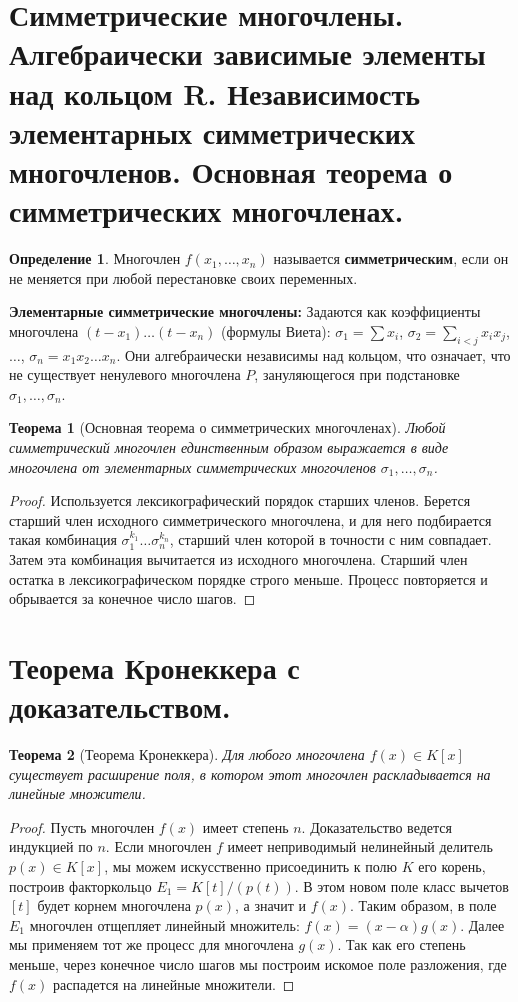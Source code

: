 \documentclass[12pt, a4paper]{article}
\theoremstyle{definition}
\newtheorem{definition}{Определение}[section]
\theoremstyle{plain}
\newtheorem{theorem}{Теорема}[section]
\begin{document}
	\newpage
	\section{Симметрические многочлены. Алгебраически зависимые элементы над кольцом R. Независимость элементарных симметрических многочленов. Основная теорема о симметрических многочленах.}
	
	\begin{definition}
		Многочлен $f(x_1, \dots, x_n)$ называется \textbf{симметрическим}, если он не меняется при любой перестановке своих переменных.
	\end{definition}
	
	\textbf{Элементарные симметрические многочлены:}
	Задаются как коэффициенты многочлена $(t-x_1)\dots(t-x_n)$ (формулы Виета):
	$\sigma_1 = \sum x_i$, $\sigma_2 = \sum_{i<j} x_i x_j$, $\dots$, $\sigma_n = x_1 x_2 \dots x_n$. Они алгебраически независимы над кольцом, что означает, что не существует ненулевого многочлена $P$, зануляющегося при подстановке $\sigma_1, \dots, \sigma_n$.
	
	\begin{theorem}[Основная теорема о симметрических многочленах]
		Любой симметрический многочлен единственным образом выражается в виде многочлена от элементарных симметрических многочленов $\sigma_1, \dots, \sigma_n$.
	\end{theorem}
	\begin{proof}
		Используется лексикографический порядок старших членов. Берется старший член исходного симметрического многочлена, и для него подбирается такая комбинация $\sigma_1^{k_1}\dots\sigma_n^{k_n}$, старший член которой в точности с ним совпадает. Затем эта комбинация вычитается из исходного многочлена. Старший член остатка в лексикографическом порядке строго меньше. Процесс повторяется и обрывается за конечное число шагов.
	\end{proof}
	
	\newpage
	\section{Теорема Кронеккера с доказательством.}
	
	\begin{theorem}[Теорема Кронеккера]
		Для любого многочлена $f(x) \in K[x]$ существует расширение поля, в котором этот многочлен раскладывается на линейные множители.
	\end{theorem}
	\begin{proof}
		Пусть многочлен $f(x)$ имеет степень $n$. Доказательство ведется индукцией по $n$.
		Если многочлен $f$ имеет неприводимый нелинейный делитель $p(x) \in K[x]$, мы можем искусственно присоединить к полю $K$ его корень, построив факторкольцо $E_1 = K[t]/(p(t))$. В этом новом поле класс вычетов $[t]$ будет корнем многочлена $p(x)$, а значит и $f(x)$.
		Таким образом, в поле $E_1$ многочлен отщепляет линейный множитель: $f(x) = (x-\alpha)g(x)$. 
		Далее мы применяем тот же процесс для многочлена $g(x)$. Так как его степень меньше, через конечное число шагов мы построим искомое поле разложения, где $f(x)$ распадется на линейные множители.
	\end{proof}
	
\end{document}
